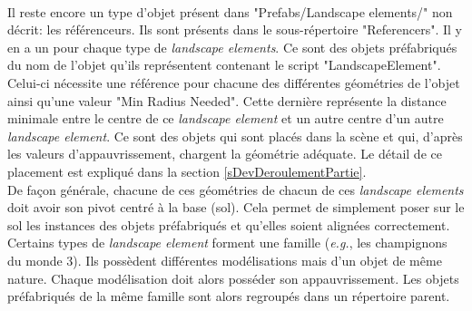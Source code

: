 		\medskip
		\begin{minipage}{\linewidth}
			\label{ObjectLibraryV2}
		\end{minipage}\medskip%
		\\
		
		Il reste encore un type d'objet présent dans "Prefabs/Landscape elements/" non décrit: les référenceurs. Ils sont présents dans le sous-répertoire "Referencers". Il y en a un pour chaque type de \textit{landscape elements}. Ce sont des objets préfabriqués du nom de l'objet qu'ils représentent contenant le script "LandscapeElement". Celui-ci nécessite une référence pour chacune des différentes géométries de l'objet ainsi qu'une valeur "Min Radius Needed". Cette dernière représente la distance minimale entre le centre de ce \textit{landscape element} et un autre centre d'un autre \textit{landscape element}. Ce sont des objets qui sont placés dans la scène et qui, d'après les valeurs d'appauvrissement, chargent la géométrie adéquate. Le détail de ce placement est expliqué dans la section \ref{sDevDeroulementPartie}.
		\\
		
		De façon générale, chacune de ces géométries de chacun de ces \textit{landscape elements} doit avoir son pivot centré à la base (sol). Cela permet de simplement poser sur le sol les instances des objets préfabriqués et qu'elles soient alignées correctement. Certains types de \textit{landscape element} forment une famille (\textit{e.g.}, les champignons du monde 3). Ils possèdent différentes modélisations mais d'un objet de même nature. Chaque modélisation doit alors posséder son appauvrissement. Les objets préfabriqués de la même famille sont alors regroupés dans un répertoire parent.%
		
